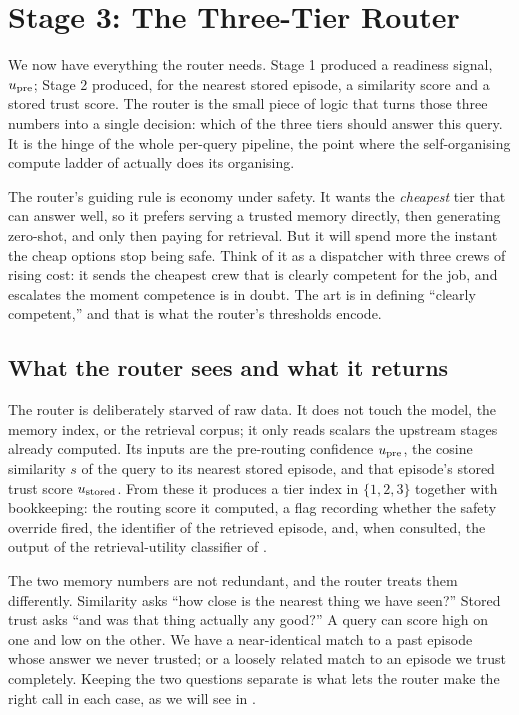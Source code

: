 \chapter{Stage 3: The Three-Tier Router}
\label{ch:router}

We now have everything the router needs. Stage 1 produced a readiness signal,
$u_{\text{pre}}$; Stage 2 produced, for the nearest stored episode, a similarity score and
a stored trust score. The router is the small piece of logic that turns those
three numbers into a single decision: which of the three tiers should answer this
query. It is the hinge of the whole per-query pipeline, the point where the
self-organising compute ladder of  actually does its
organising.

\begin{intuition}
The router's guiding rule is economy under safety. It wants the \emph{cheapest}
tier that can answer well, so it prefers serving a trusted memory directly, then
generating zero-shot, and only then paying for retrieval. But it will spend more
the instant the cheap options stop being safe. Think of it as a dispatcher with
three crews of rising cost: it sends the cheapest crew that is clearly competent
for the job, and escalates the moment competence is in doubt. The art is in
defining ``clearly competent,'' and that is what the router's thresholds encode.
\end{intuition}

\section{What the router sees and what it returns}
\label{sec:router-io}

The router is deliberately starved of raw data. It does not touch the model, the
memory index, or the retrieval corpus; it only reads scalars the upstream stages
already computed. Its inputs are the pre-routing confidence $u_{\text{pre}}$, the cosine
similarity $s$ of the query to its nearest stored episode, and that episode's
stored trust score $u_{\text{stored}}$. From these it produces a tier index in
$\{1, 2, 3\}$ together with bookkeeping: the routing score it computed, a flag
recording whether the safety override fired, the identifier of the retrieved
episode, and, when consulted, the output of the retrieval-utility classifier of
.

\begin{intuition}
The two memory numbers are not redundant, and the router treats them differently.
Similarity asks ``how close is the nearest thing we have seen?'' Stored trust asks
``and was that thing actually any good?'' A query can score high on one and low on
the other. We have a near-identical match to a past episode whose answer we never
trusted; or a loosely related match to an episode we trust completely. Keeping the
two questions separate is what lets the router make the right call in each case,
as we will see in .
\end{intuition}

